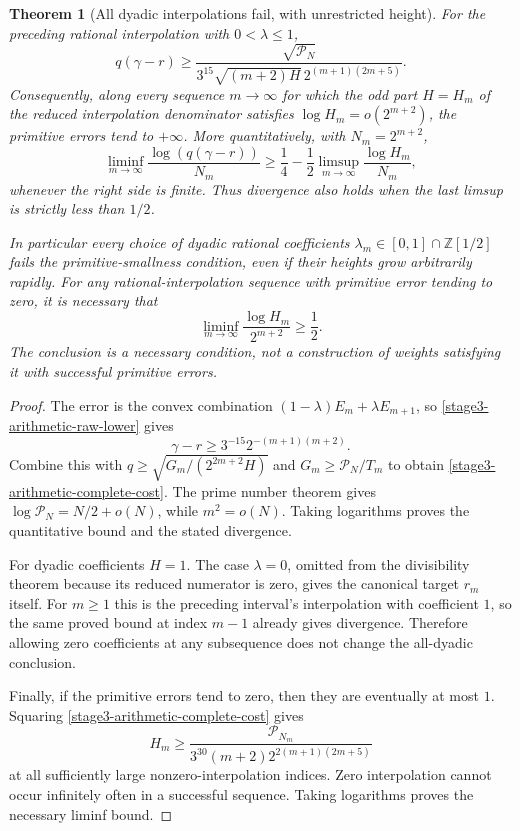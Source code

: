 \documentclass[11pt,a4paper]{article}
\newtheorem{theorem}{Theorem}[section]
\theoremstyle{definition}
\theoremstyle{remark}
\begin{document}
\begin{theorem}[All dyadic interpolations fail, with unrestricted height]
\label{stage3-arithmetic-dyadic-obstruction}
For the preceding rational interpolation with $0<\lambda\le1$,
\begin{equation}\label{stage3-arithmetic-complete-cost}
 q(\gamma-r)\ge
 \frac{\sqrt{\mathcal P_N}}
 {3^{15}\sqrt{(m+2)H}\,2^{(m+1)(2m+5)}}.
\end{equation}
Consequently, along every sequence $m\to\infty$ for which the odd part
$H=H_m$ of the reduced interpolation denominator satisfies
$\log H_m=o(2^{m+2})$, the primitive errors tend to $+\infty$.
More quantitatively, with $N_m=2^{m+2}$,
\[
 \liminf_{m\to\infty}\frac{\log(q(\gamma-r))}{N_m}
 \ge\frac14-\frac12
       \limsup_{m\to\infty}\frac{\log H_m}{N_m},
\]
whenever the right side is finite. Thus divergence also holds when the
last limsup is strictly less than $1/2$.

In particular every choice of dyadic rational coefficients
$\lambda_m\in[0,1]\cap\mathbb Z[1/2]$ fails the primitive-smallness
condition, even if their heights grow arbitrarily rapidly.
For any rational-interpolation sequence with primitive error tending
to zero, it is necessary that
\[
 \liminf_{m\to\infty}\frac{\log H_m}{2^{m+2}}\ge\frac12.
\]
The conclusion is a necessary condition, not a construction of weights
satisfying it with successful primitive errors.
\end{theorem}

\begin{proof}
The error is the convex combination
$(1-\lambda)E_m+\lambda E_{m+1}$, so
\eqref{stage3-arithmetic-raw-lower} gives
\[
 \gamma-r\ge3^{-15}2^{-(m+1)(m+2)}.
\]
Combine this with
$q\ge\sqrt{G_m/(2^{2m+2}H)}$ and
$G_m\ge\mathcal P_N/T_m$ to obtain
\eqref{stage3-arithmetic-complete-cost}.
The prime number theorem \cite{dlmf-primes} gives
$\log\mathcal P_N=N/2+o(N)$, while $m^2=o(N)$. Taking logarithms proves
the quantitative bound and the stated divergence.

For dyadic coefficients $H=1$. The case $\lambda=0$, omitted from the
divisibility theorem because its reduced numerator is zero, gives the
canonical target $r_m$ itself. For $m\ge1$ this is the preceding
interval's interpolation with coefficient $1$, so the same proved bound
at index $m-1$ already gives divergence. Therefore allowing zero coefficients at any
subsequence does not change the all-dyadic conclusion.

Finally, if the primitive errors tend to zero, then they are eventually
at most $1$. Squaring \eqref{stage3-arithmetic-complete-cost} gives
\[
 H_m\ge
 \frac{\mathcal P_{N_m}}
 {3^{30}(m+2)2^{2(m+1)(2m+5)}}
\]
at all sufficiently large nonzero-interpolation indices. Zero
interpolation cannot occur infinitely often in a successful sequence.
Taking logarithms proves the necessary liminf bound.
\end{proof}
\end{document}
